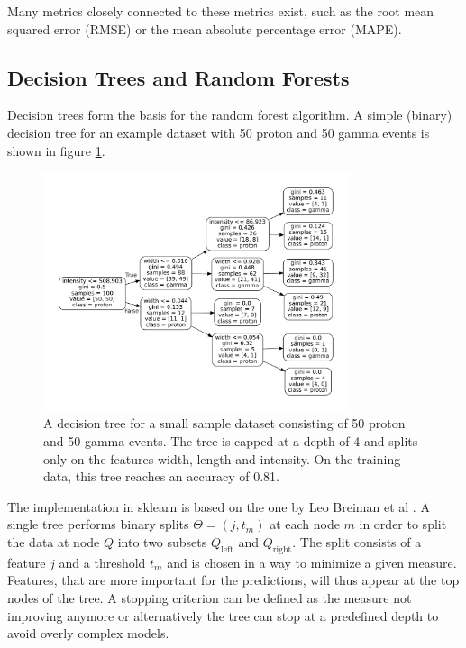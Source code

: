 Many metrics closely connected to these metrics exist, such as the root mean squared error (RMSE)
or the mean absolute percentage error (MAPE).

\subsection{Decision Trees and Random Forests}
Decision trees form the basis for the random forest algorithm.
A simple (binary) decision tree
for an example dataset with 50 proton and 50 gamma
events is shown in figure \ref{fig:03_tree}.

\begin{figure}
  \centering
  \captionsetup{width=0.9\linewidth}
  \includegraphics[width=0.8\textwidth]{Plots/decision_tree.pdf}
  \caption{A decision tree for a small sample dataset consisting of 50 proton and
  50 gamma events. The tree is capped at a depth of 4 and splits only on the 
  features width, length and intensity. On the training data, this tree reaches an
  accuracy of \num{0.81}.}
  \label{fig:03_tree}
\end{figure}


The implementation in sklearn is based on the one by
Leo Breiman et al \cite{breimanclassification}.
A single tree performs binary splits $\Theta = (j, t_m)$
at each node $m$ in order to split
the data at node $Q$ into two subsets
$Q_\text{left}$
and
$Q_\text{right}$.
The split consists of a feature $j$ and a threshold $t_m$ and is
chosen in a way to minimize a given measure.
Features, that are more important for the predictions, will
thus appear at the top nodes of the tree.
A stopping criterion can be defined as the measure not improving anymore or
alternatively the tree can stop at a predefined depth to
avoid overly complex models.

